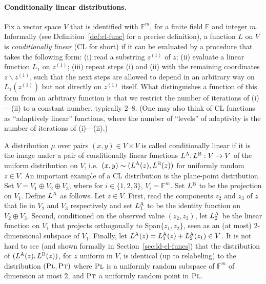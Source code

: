 \documentclass[11pt]{article}
\theoremstyle{definition}
\newcommand{\F}{\ensuremath{\mathbb{F}}}
\newcommand{\labelstyle}[1]{\ensuremath{\textsc{#1}}\xspace}
\newcommand{\plf}{\labelstyle{Pl}}
\newcommand{\ptf}{\labelstyle{Pt}}
\newcommand{\alice}{\labelstyle{A}}
\newcommand{\bob}{\labelstyle{B}}
\begin{document}
\paragraph{Conditionally linear distributions.} 
Fix a vector space $V$ that is identified with $\F^m$, for a finite field $\F$ and integer $m$. Informally (see Definition~\ref{def:cl-func} for a precise definition), a function $L$ on $V$ is \emph{conditionally linear} (CL for short) if it can be evaluated by a procedure that takes the following form: (i) read a substring $z^{(1)}$ of $z$; (ii) evaluate a linear function $L_1$ on $z^{(1)}$; (iii) repeat steps (i) and (ii) with the remaining coordinates $z\backslash z^{(1)}$, such that the next steps are allowed to depend in an arbitrary way on $L_1(z^{(1)})$ but not directly on $z^{(1)}$ itself. What distinguishes a function of this form from an arbitrary function is that we restrict the number of iterations of (i)---(ii) to a constant number, typically 2--8. (One may also think of CL functions as ``adaptively linear'' functions, where the number of ``levels'' of adaptivity is the number of iterations of (i)---(ii).)

A distribution $\mu$ over pairs $(x,y) \in V\times V$ is called {conditionally linear}  if it is the image under a pair of {conditionally linear functions} $L^\alice,L^\bob: V\to V$ of the uniform distribution on $V$, i.e.\ $(x,y)\sim (L^\alice(z),L^\bob(z))$ for uniformly random $z\in V$. An important example of a CL distribution is the plane-point distribution. Set $V = V_1 \oplus V_2 \oplus V_3$, where for $i\in\{1,2,3\}$, $V_i =\F^m$. Set $L^\bob$ to be the projection on $V_1$. Define $L^\alice$ as follows. Let $z\in V$. First, read the components $z_2$ and $z_3$ of $z$ that lie in $V_2$ and $V_3$ respectively and set $L_1^\alice$ to be the identity function on $V_2 \oplus V_3$. Second, conditioned on the observed value $(z_2,z_3)$, let $L_2^\alice$ be the linear function on $V_1$ that projects orthogonally to Span$\{z_1,z_2\}$, seen as an (at most) $2$-dimensional subspace of $V_1$. Finally, let $L^\alice(z)= L_1^\alice(z) + L_2^\alice(z_1) \in V$. It is not hard to see (and shown formally in Section~\ref{sec:ld-cl-funcs}) that the distribution of $(L^\alice(z),L^\bob(z))$, for $z$ uniform in $V$, is identical (up to relabeling) to the distribution $(\plf,\ptf)$ where $\plf$ is a uniformly random subspace of $\F^m$ of dimension at most $2$, and $\ptf$ a uniformly random point in $\plf$.
\end{document}
